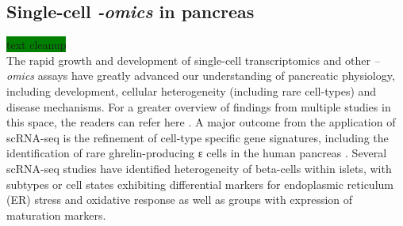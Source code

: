 \subsection{Single-cell \textit{-omics} in pancreas}
\label{sec:143}
\colorbox{green}{text cleanup}\\
The rapid growth and development of single-cell transcriptomics and other \textit{–omics} assays have greatly advanced our understanding of pancreatic physiology, including development, cellular heterogeneity (including rare cell-types) and disease mechanisms. For a greater overview of findings from multiple studies in this space, the readers can refer here \textbf{\cite{wang_single-cell_2019,avrahami_beta_2017,carrano_interrogating_2017}}. A major outcome from the application of scRNA-seq is the refinement of cell-type specific gene signatures, including the identification of rare ghrelin-producing ε cells in the human pancreas \textbf{\cite{segerstolpe_single-cell_2016}}. Several scRNA-seq studies have identified heterogeneity of beta-cells within islets, with subtypes \textbf{\cite{segerstolpe_single-cell_2016}} or cell states exhibiting differential markers for endoplasmic reticulum (ER) stress \textbf{\cite{baron_single-cell_2016,muraro_single-cell_2016}} and oxidative response \textbf{\cite{muraro_single-cell_2016}} as well as groups with expression of maturation markers.\\\\
